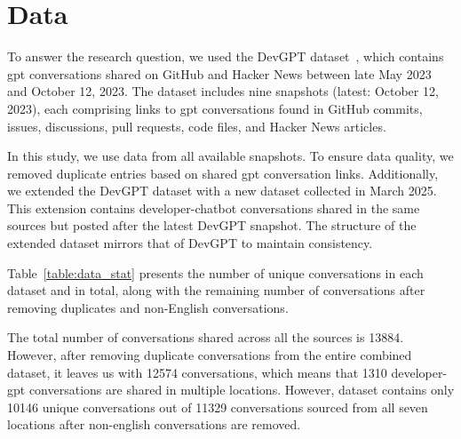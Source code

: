 \chapter{Data}\label{sec:data}
To answer the research question, we used the DevGPT dataset~\cite{devgpt}, which contains \acrshort{gpt} conversations shared on GitHub and Hacker News between late May 2023 and October 12, 2023. The dataset includes nine snapshots (latest: October 12, 2023), each comprising links to \acrshort{gpt} conversations found in GitHub commits, issues, discussions, pull requests, code files, and Hacker News articles.

In this study, we use data from all available snapshots. To ensure data quality, we removed duplicate entries based on shared \acrshort{gpt} conversation links. Additionally, we extended the DevGPT dataset with a new dataset collected in March 2025. This extension contains developer-chatbot conversations shared in the same sources but posted after the latest DevGPT snapshot. The structure of the extended dataset mirrors that of DevGPT to maintain consistency.

Table~\ref{table:data_stat} presents the number of unique conversations in each dataset and in total, along with the remaining number of conversations after removing duplicates and non-English conversations.

\begin{table}[h]
    \centering
    \caption{Number of conversations after all the duplicates (DR) and non-English conversations (NE) were removed from the data.}
    \label{table:data_stat}
\end{table}

The total number of conversations shared across all the sources is 13884. However, after removing duplicate conversations from the entire combined dataset, it leaves us with 12574 conversations, which means that 1310 \linebreak developer-\acrshort{gpt} conversations are shared in multiple locations. However, dataset contains only 10146 unique conversations out of 11329 conversations sourced from all seven locations after non-english conversations are removed.

